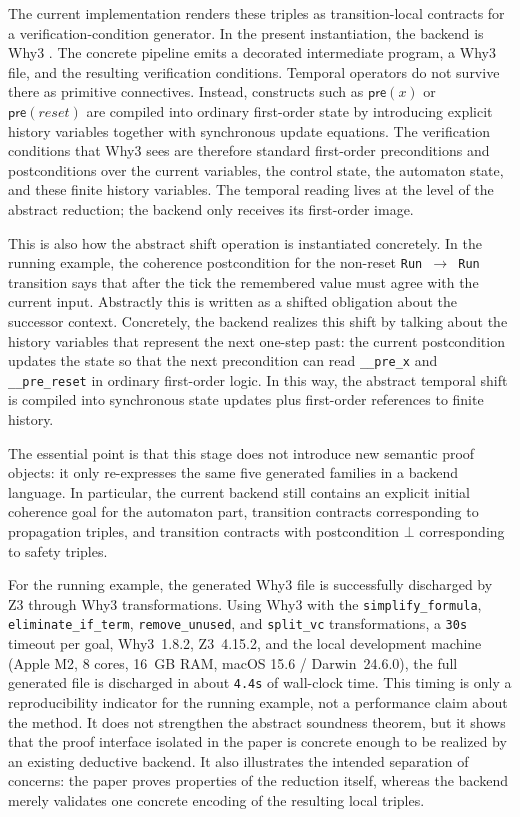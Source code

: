 \documentclass[acmsmall,screen]{acmart}
\theoremstyle{leftplain}
\theoremstyle{leftdefinition}
\theoremstyle{leftremark}
\begin{document}
The current implementation renders these triples as transition-local contracts
for a verification-condition generator. In the present instantiation, the
backend is Why3 \cite{why3}. The concrete pipeline emits a decorated
intermediate program, a Why3 file, and the resulting verification conditions.
Temporal operators do not survive there as primitive connectives. Instead,
constructs such as $\mathsf{pre}(x)$ or $\mathsf{pre}(reset)$ are compiled into
ordinary first-order state by introducing explicit history variables together
with synchronous update equations. The verification conditions that Why3 sees
are therefore standard first-order preconditions and postconditions over the
current variables, the control state, the automaton state, and these finite
history variables. The temporal reading lives at the level of the abstract
reduction; the backend only receives its first-order image.

This is also how the abstract shift operation is instantiated concretely. In
the running example, the coherence postcondition for the non-reset
\texttt{Run $\to$ Run} transition says that after the tick the remembered value
must agree with the current input. Abstractly this is written as a shifted
obligation about the successor context. Concretely, the backend realizes this
shift by talking about the history variables that represent the next one-step
past: the current postcondition updates the state so that the next precondition
can read \texttt{\_\_pre\_x} and \texttt{\_\_pre\_reset} in ordinary first-order
logic. In this way, the abstract temporal shift is compiled into synchronous
state updates plus first-order references to finite history.

The essential point is that this stage does not introduce new semantic proof
objects: it only re-expresses the same five generated families in a backend
language. In particular, the current backend still contains an explicit initial
coherence goal for the automaton part, transition contracts corresponding to
propagation triples, and transition contracts with postcondition $\bot$
corresponding to safety triples.

For the running example, the generated Why3 file is successfully discharged by
Z3 through Why3 transformations. Using Why3 with the
\texttt{simplify\_formula}, \texttt{eliminate\_if\_term},
\texttt{remove\_unused}, and \texttt{split\_vc} transformations, a
\texttt{30s} timeout per goal, Why3~1.8.2, Z3~4.15.2, and the local development
machine (Apple M2, 8 cores, 16~GB RAM, macOS 15.6 / Darwin~24.6.0), the full
generated file is discharged in about \texttt{4.4s} of wall-clock time. This
timing is only a reproducibility indicator for the running example, not a
performance claim about the method. It does not strengthen the abstract
soundness theorem, but it shows that the proof interface isolated in the paper
is concrete enough to be realized by an existing deductive backend. It also
illustrates the intended separation of concerns: the paper proves properties of
the reduction itself, whereas the backend merely validates one concrete
encoding of the resulting local triples.
\end{document}
